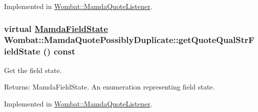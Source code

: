 Implemented in \hyperlink{classWombat_1_1MamdaQuoteListener_e33ca4e1fa76fb882185676c0d865be7}{Wombat::Mamda\-Quote\-Listener}.\hypertarget{classWombat_1_1MamdaQuotePossiblyDuplicate_07b2ca2e8757b69c7a82209a99776d58}{
\subsubsection[getQuoteQualStrFieldState]{\setlength{\rightskip}{0pt plus 5cm}virtual \hyperlink{namespaceWombat_93aac974f2ab713554fd12a1fa3b7d2a}{Mamda\-Field\-State} Wombat::Mamda\-Quote\-Possibly\-Duplicate::get\-Quote\-Qual\-Str\-Field\-State () const}}
\label{classWombat_1_1MamdaQuotePossiblyDuplicate_07b2ca2e8757b69c7a82209a99776d58}


Get the field state. 

\begin{Desc}
\item[Returns:]Mamda\-Field\-State. An enumeration representing field state. \end{Desc}


Implemented in \hyperlink{classWombat_1_1MamdaQuoteListener_90a6df719e3f391f19edf4796f947b35}{Wombat::Mamda\-Quote\-Listener}.